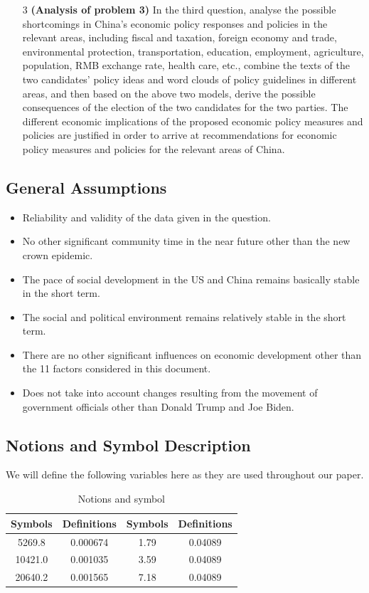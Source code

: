 \documentclass{apmcmthesis}
\begin{document}
\begin{enumerate}
	\item[3] \textbf{(Analysis of problem 3)}
	In the third question, analyse the possible shortcomings in China's economic policy responses and policies in the relevant areas, including fiscal and taxation, foreign economy and trade, environmental protection, transportation, education, employment, agriculture, population, RMB exchange rate, health care, etc., combine the texts of the two candidates' policy ideas and word clouds of policy guidelines in different areas, and then based on the above two models, derive the possible consequences of the election of the two candidates for the two parties. The different economic implications of the proposed economic policy measures and policies are justified in order to arrive at recommendations for economic policy measures and policies for the relevant areas of China.
\end{enumerate}

\subsection{General Assumptions}

\begin{itemize}
  \item Reliability and validity of the data given in the question.
  \item No other significant community time in the near future other than the new crown epidemic.
  \item The pace of social development in the US and China remains basically stable in the short term.
  \item The social and political environment remains relatively stable in the short term.
  \item There are no other significant influences on economic development other than the 11 factors considered in this document.
  \item Does not take into account changes resulting from the movement of government officials other than Donald Trump and Joe Biden.
\end{itemize}


\subsection{Notions and Symbol Description}
We will define the following variables here as they are used throughout our paper.
\begin{table}[H]
	\caption{Notions and symbol}\label{tab:101} \centering
	\begin{tabular}{cccc}
		\toprule[1.5pt]
		Symbols& Definitions & Symbols & Definitions\\
		\midrule[1pt]
		5269.8 & 0.000674 & 1.79 & 0.04089\\
		10421.0 & 0.001035 & 3.59 & 0.04089\\
		20640.2 & 0.001565 & 7.18 & 0.04089\\
		\bottomrule[1.5pt]
	\end{tabular}
\end{table}
\end{document}
